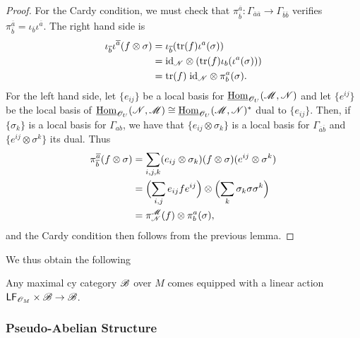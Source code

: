 \begin{proof}
For the Cardy condition, we must check that $\pi^{\overline{a}}_{\overline{b}}:\Gamma_{\overline{a}\overline{a}}\to \Gamma_{\overline{b}\overline{b}}$ verifies $\pi^{\overline{a}}_{\overline{b}}=\iota_{\overline{b}}\iota^{\overline{a}}$. The right hand side is
$$
\begin{aligned}
\iota_{\overline{b}}\iota^{\overline{a}}(f\otimes \sigma ) &= \iota_{\overline{b}}(\operatorname{tr}(f)\iota^a(\sigma )) \\
&= \text{id}_{\mathscr{N}}\otimes (\operatorname{tr}(f)\iota_b(\iota^a(\sigma ))) \\
&= \operatorname{tr}(f) \; \text{id}_{\mathscr{N}}\otimes \pi^a_b(\sigma ). \\
\end{aligned}
$$
For the left hand side, let $\{e_{ij}\}$ be a local basis for $\underline{\operatorname{Hom}}_{\mathscr{O}_U}(\mathscr{M},\mathscr{N})$ and let $\{e^{ij}\}$ be the local basis of $\underline{\operatorname{Hom}}_{\mathscr{O}_U}(\mathscr{N},\mathscr{M})\cong \underline{\operatorname{Hom}}_{\mathscr{O}_U}(\mathscr{M},\mathscr{N})^*$ dual to $\{e_{ij}\}$. Then, if $\{\sigma_k\}$ is a local basis for $\Gamma_{ab}$, we have that $\{e_{ij}\otimes \sigma_k\}$ is a local basis for $\Gamma_{\overline{a}\overline{b}}$ and $\{e^{ij}\otimes \sigma^k\}$ its dual. Thus
$$
\begin{aligned}
\pi^{\overline{a}}_{\overline{b}}(f\otimes \sigma ) &= \sum_{i,j,k}(e_{ij}\otimes \sigma_k)(f\otimes \sigma )(e^{ij}\otimes \sigma^k) \\
&= \Bigl (\sum_{i,j}e_{ij}fe^{ij}\Bigr )\otimes \Bigl (\sum_k\sigma_k\sigma \sigma^k \Bigr ) \\
&= \pi^{\mathscr{M}}_{\mathscr{N}}(f)\otimes \pi^a_b(\sigma ), \\
\end{aligned}
$$
and the Cardy condition then follows from the previous lemma.
\end{proof}

We thus obtain the following

\begin{cor}
Any maximal {\sc cy} category $\mathscr{B}$ over $M$ comes equipped with a linear action $\mathsf{LF}_{\mathscr{O}_M}\times \mathscr{B}\to \mathscr{B}$.
\end{cor}  



\subsubsection{Pseudo-Abelian Structure}


